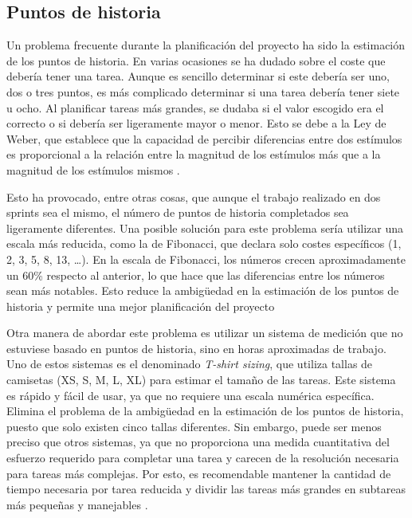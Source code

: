 \subsection{Puntos de historia}
Un problema frecuente durante la planificación del proyecto ha sido la estimación de los puntos
de historia. En varias ocasiones se ha dudado sobre el coste que debería tener una tarea. Aunque
es sencillo determinar si este debería ser uno, dos o tres puntos, es más complicado determinar
si una tarea debería tener siete u ocho. Al planificar tareas más grandes, se dudaba si el valor
escogido era el correcto o si debería ser ligeramente mayor o menor. Esto se debe a la Ley de
Weber, que establece que la capacidad de percibir diferencias entre dos estímulos es proporcional
a la relación entre la magnitud de los estímulos más que a la magnitud de los estímulos mismos
\parencite{WeberLaw}.

Esto ha provocado, entre otras cosas, que aunque el trabajo realizado en dos sprints sea el mismo,
el número de puntos de historia completados sea ligeramente diferentes. Una posible solución para
este problema sería utilizar una escala más reducida, como la de Fibonacci, que declara solo
costes específicos (1, 2, 3, 5, 8, 13, …). En la escala de Fibonacci, los números crecen
aproximadamente un 60\% respecto al anterior, lo que hace que las diferencias entre los números
sean más notables. Esto reduce la ambigüedad en la estimación de los puntos de historia y
permite una mejor planificación del proyecto \parencites{Cohn2025Jun}{MariaMedicion}

Otra manera de abordar este problema es utilizar un sistema de medición que no estuviese basado
en puntos de historia, sino en horas aproximadas de trabajo. Uno de estos sistemas es el denominado
\textit{T-shirt sizing}, que utiliza tallas de camisetas (XS, S, M, L, XL) para estimar el tamaño
de las tareas. Este sistema es rápido y fácil de usar, ya que no requiere una escala numérica
específica. Elimina el problema de la ambigüedad en la estimación de los puntos de historia, puesto
que solo existen cinco tallas diferentes. Sin embargo, puede ser menos preciso que otros sistemas,
ya que no proporciona una medida cuantitativa del esfuerzo requerido para completar una tarea y
carecen de la resolución necesaria para tareas más complejas. Por esto, es recomendable mantener
la cantidad de tiempo necesaria por tarea reducida y dividir las tareas más grandes en subtareas
más pequeñas y manejables \parencites{mallidi2021study}{Krdzic2025May}.

